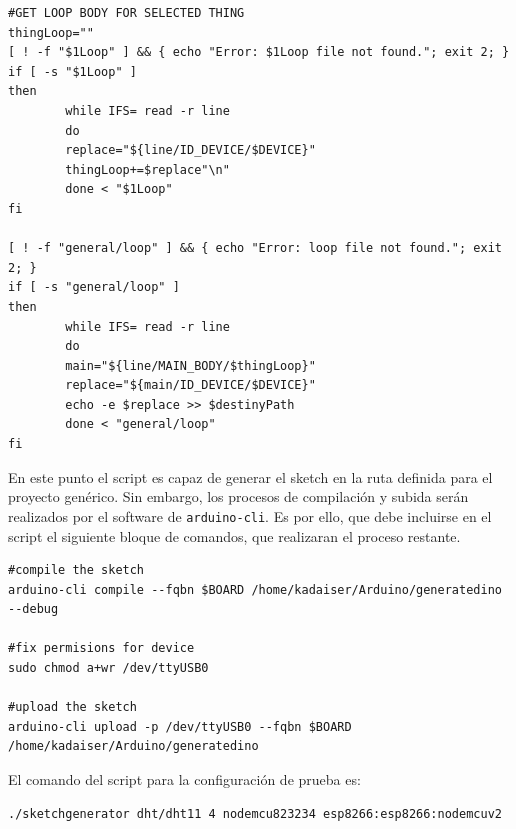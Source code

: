 \begin{verbatim}
#GET LOOP BODY FOR SELECTED THING
thingLoop=""
[ ! -f "$1Loop" ] && { echo "Error: $1Loop file not found."; exit 2; }
if [ -s "$1Loop" ]
then
        while IFS= read -r line
        do
        replace="${line/ID_DEVICE/$DEVICE}"
        thingLoop+=$replace"\n"
        done < "$1Loop"
fi

[ ! -f "general/loop" ] && { echo "Error: loop file not found."; exit 2; }
if [ -s "general/loop" ]
then
        while IFS= read -r line
        do
        main="${line/MAIN_BODY/$thingLoop}"
        replace="${main/ID_DEVICE/$DEVICE}"
        echo -e $replace >> $destinyPath
        done < "general/loop"
fi

\end{verbatim}

En este punto el \gls{script} es capaz de generar el sketch en la ruta definida para el proyecto genérico. Sin embargo, los procesos de compilación y subida serán realizados por el software de \verb|arduino-cli|. Es por ello, que debe incluirse en el \gls{script} el siguiente bloque de comandos, que realizaran el proceso restante.

\begin{verbatim}
#compile the sketch
arduino-cli compile --fqbn $BOARD /home/kadaiser/Arduino/generatedino --debug

#fix permisions for device
sudo chmod a+wr /dev/ttyUSB0

#upload the sketch
arduino-cli upload -p /dev/ttyUSB0 --fqbn $BOARD /home/kadaiser/Arduino/generatedino
\end{verbatim}

El comando del \gls{script} para la configuración de prueba es:
\begin{verbatim}
./sketchgenerator dht/dht11 4 nodemcu823234 esp8266:esp8266:nodemcuv2
\end{verbatim}